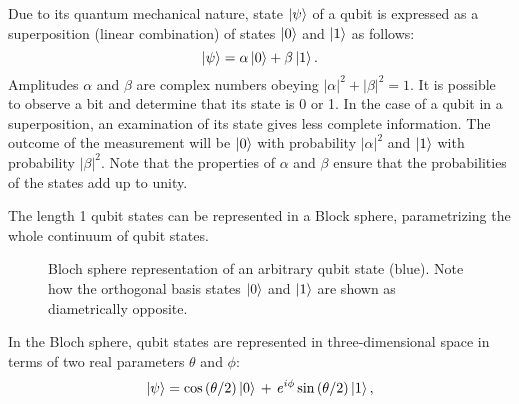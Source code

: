 Due to its quantum mechanical nature, state $\ket{\psi}$ of a qubit is expressed as a superposition (linear combination) of states $\ket{0}$ and $\ket{1}$ as follows:
\begin{equation}
    \ket{\psi}=\alpha\ket{0}+\beta\ket{1}.
\end{equation}
Amplitudes $\alpha$ and $\beta$ are complex numbers obeying $|\alpha|^2+|\beta|^2 = 1$. It is possible to observe a bit and determine that its state is 0 or 1. In the case of a qubit in a superposition, an examination of its state gives less complete information. The outcome of the measurement will be $\ket{0}$ with probability $|\alpha|^2$ and $\ket{1}$ with probability $|\beta|^2$. Note that the properties of $\alpha$ and $\beta$ ensure that the probabilities of the states add up to unity.

The length 1 qubit states can be represented in a Block sphere, parametrizing the whole continuum of qubit states.
\begin{figure}
    \centering
    \caption[Bloch sphere representation of a qubit state]{Bloch sphere representation of an arbitrary qubit state (blue). Note how the orthogonal basis states $\ket{0}$ and $\ket{1}$ are shown as diametrically opposite.}
    \label{fig:bloch_sphere}
    \end{figure}
In the Bloch sphere, qubit states are represented in three-dimensional space in terms of two real parameters $\theta$ and $\phi$:
\begin{equation}
    \ket{\psi} =\cos \left(\theta /2\right)\ket{0} \,+\,e^{i\phi }\sin \left(\theta /2\right)\ket{1},
\end{equation}
